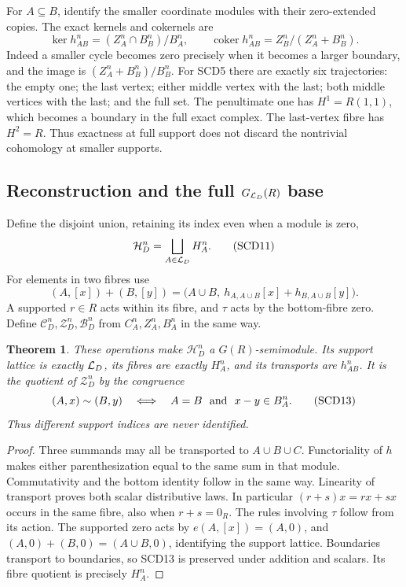 \documentclass[11pt,a4paper]{article}
\newtheorem{theorem}{Theorem}[section]
\theoremstyle{definition}\newtheorem{definition}[theorem]{Definition}
\begin{document}
For \(A\subseteq B\), identify the smaller coordinate modules with
their zero-extended copies. The exact kernels and cokernels are
\[
 \ker h_{AB}^n=(Z_A^n\cap B_B^n)/B_A^n,\qquad
 \operatorname{coker}h_{AB}^n=Z_B^n/(Z_A^n+B_B^n).
 \tag{SCD10}
\]
Indeed a smaller cycle becomes zero precisely when it becomes a
larger boundary, and the image is
\((Z_A^n+B_B^n)/B_B^n\).
For SCD5 there are exactly six trajectories: the empty one; the
last vertex; either middle vertex with the last; both middle vertices
with the last; and the full set. The penultimate one has
\(H^1=R(1,1)\), which becomes a boundary in the full exact complex.
The last-vertex fibre has \(H^2=R\). Thus exactness at full support
does not discard the nontrivial cohomology at smaller supports.

\subsection{Reconstruction and the full \(G_{\mathcal L_D}(R)\) base}

Define the disjoint union, retaining its index even when a module is zero,
\[
 \mathcal H_D^n=\bigsqcup_{A\in\mathcal L_D}H_A^n.
 \tag{SCD11}
\]
For elements in two fibres use
\[
 (A,[x])+(B,[y])
 =\bigl(A\cup B,\ h_{A,A\cup B}[x]+h_{B,A\cup B}[y]\bigr).
 \tag{SCD12}
\]
A supported \(r\in R\) acts within its fibre, and \(\tau\) acts by
the bottom-fibre zero. Define \(\mathcal C_D^n,\mathcal Z_D^n,
\mathcal B_D^n\) from \(C_A^n,Z_A^n,B_A^n\) in the same way.

\begin{theorem}
These operations make \(\mathcal H_D^n\) a \(G(R)\)-semimodule.
Its support lattice is exactly \(\mathcal L_D\), its fibres are exactly
\(H_A^n\), and its transports are \(h_{AB}^n\). It is the quotient
of \(\mathcal Z_D^n\) by the congruence
\[
 (A,x)\sim(B,y)
 \quad\Longleftrightarrow\quad A=B\ \hbox{ and }\ x-y\in B_A^n.
 \tag{SCD13}
\]
Thus different support indices are never identified.
\end{theorem}
\begin{proof}
Three summands may all be transported to \(A\cup B\cup C\).
Functoriality of \(h\) makes either parenthesization equal to
the same sum in that module. Commutativity and the bottom identity
follow in the same way. Linearity of transport proves both scalar
distributive laws. In particular \((r+s)x=rx+sx\) occurs in the
same fibre, also when \(r+s=0_R\). The rules involving \(\tau\)
follow from its action. The supported zero acts by
\(e(A,[x])=(A,0)\), and
\((A,0)+(B,0)=(A\cup B,0)\), identifying the support lattice.
Boundaries transport to boundaries, so SCD13 is preserved under
addition and scalars. Its fibre quotient is precisely \(H_A^n\).
\end{proof}
\end{document}
